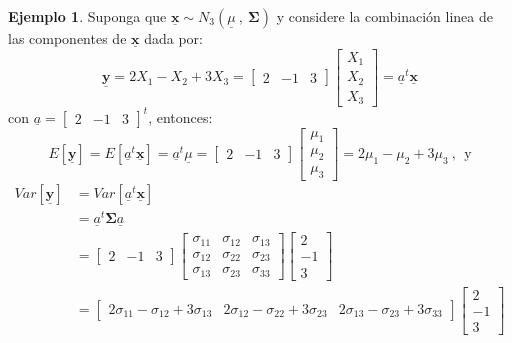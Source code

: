 \documentclass[
]{book}
\theoremstyle{definition}
\theoremstyle{definition}
\newtheorem{example}{Ejemplo}[chapter]
\theoremstyle{definition}
\theoremstyle{definition}
\theoremstyle{remark}
\begin{document}
\begin{example}
\protect\hypertarget{exm:ejemplo-prop-1}{}\label{exm:ejemplo-prop-1}Suponga que \(\underline{\mathbf{x}}\sim N_3 (\underline{\mu} \ , \ \mathbf{\Sigma})\) y considere la combinación linea de las componentes de \(\underline{\mathbf{x}}\) dada por:
\[
\underline{\mathbf{y}}=2X_1-X_2+3X_3=\begin{bmatrix}
2 & -1 & 3
\end{bmatrix}\begin{bmatrix}
X_1 \\ X_2 \\ X_3
\end{bmatrix}=\underline{a}^t\underline{\mathbf{x}}
\]
con \(\underline{a}=\begin{bmatrix} 2 & -1 & 3 \end{bmatrix}^t\), entonces:
\[
E[\underline{\mathbf{y}}]=E[\underline{a}^t\underline{\mathbf{x}}]=
\underline{a}^t \underline{\mu}=\begin{bmatrix}
2 & -1 & 3
\end{bmatrix}\begin{bmatrix}
\mu_1 \\ \mu_2 \\ \mu_3
\end{bmatrix}=2\mu_1-\mu_2+3\mu_3\ , \ \ \text{y}
\]
\begin{align*}
Var[\underline{\mathbf{y}}]&=Var[\underline{a}^t\underline{\mathbf{x}}]\\
&=\underline{a}^t \mathbf{\Sigma} \underline{a}\\
&= \begin{bmatrix}
2 & -1 & 3
\end{bmatrix}\begin{bmatrix}
\sigma_{11} & \sigma_{12} & \sigma_{13}\\
\sigma_{12} & \sigma_{22} & \sigma_{23}\\
\sigma_{13} &\sigma_{23} & \sigma_{33}
\end{bmatrix} \begin{bmatrix}
2 \\ -1 \\ 3
\end{bmatrix}\\
&=\begin{bmatrix}
2\sigma_{11}-\sigma_{12}+3\sigma_{13} & 
2\sigma_{12}-\sigma_{22}+3\sigma_{23} & 
2\sigma_{13}-\sigma_{23}+3\sigma_{33}
\end{bmatrix} \begin{bmatrix}
2 \\ -1 \\ 3

\end{bmatrix}
\end{align*}
\end{example}
\end{document}
